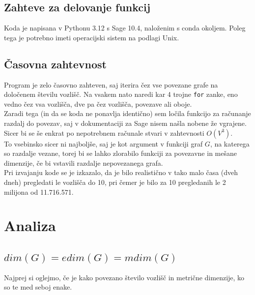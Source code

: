 \documentclass[a4paper,12pt]{article}
\theoremstyle{definition}
\theoremstyle{remark}
\theoremstyle{definition}
\begin{document}
\subsection*{Zahteve za delovanje funkcij}

Koda je napisana v Pythonu 3.12 s Sage 10.4, naloženim s conda okoljem.
Poleg tega je potrebno imeti operacijski sistem na podlagi Unix.

\subsection*{Časovna zahtevnost}

Program je zelo časovno zahteven, saj iterira čez vse povezane grafe na določenem
številu vozlišč. Na vsakem nato naredi kar 4 trojne \texttt{for} zanke, eno vedno
čez vsa vozlišča, dve pa čez vozlišča, povezave ali oboje.\\
\indent Zaradi tega (in da se koda ne ponavlja identično) sem ločila funkcijo za
računanje razdalj do povezav, saj v dokumentaciji za Sage nisem našla nobene
že vgrajene. Sicer bi se še enkrat po nepotrebnem računale stvari v zahtevnosti
$O(V^3)$. \\
\indent To vsebinsko sicer ni najboljše, saj je kot argument v funkciji
graf $G$, na katerega so razdalje vezane, torej bi se lahko zlorabilo funkciji
za povezavne in mešane dimenzije, če bi vstavili razdalje nepovezanega grafa.\\
\indent Pri izvajanju kode se je izkazalo, da je bilo realistično v tako malo časa (dveh dneh)
pregledati le vozlišča do 10, pri čemer je bilo za 10 pregledanih le 2 milijona
od 11.716.571.


\section*{Analiza}

\subsection{$dim(G) = edim(G) = mdim(G)$}
\vspace{0.5cm}

Najprej si oglejmo, če je kako povezano število vozlišč in
metrične dimenzije, ko so te med seboj enake.
\end{document}
